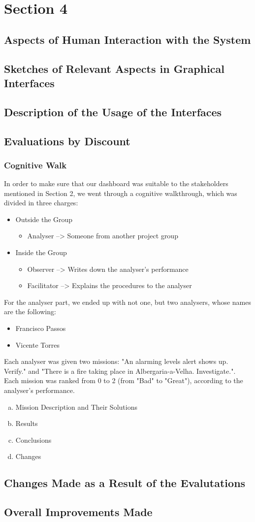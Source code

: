 \chapter{Section 4}
\section{Aspects of Human Interaction with the System}
\section{Sketches of Relevant Aspects in Graphical Interfaces}
\section{Description of the Usage of the Interfaces}
\section{Evaluations by Discount}
\subsection{Cognitive Walk}
In order to make sure that our dashboard was suitable 
to the stakeholders mentioned in Section 2, we went 
through a cognitive walkthrough, which was divided in 
three charges: 
\begin{itemize}
    \item Outside the Group
    \begin{itemize}
    \item Analyser --> Someone from another project group 
    \end{itemize}
    \item Inside the Group
    \begin{itemize}
    \item Observer --> Writes down the analyser's performance
    \item Facilitator --> Explains the procedures to the 
    analyser
    \end{itemize}
\end{itemize} \par 
For the analyser part, we ended up with not one, but two 
analysers, whose names are the following:
\begin{itemize}
    \item Francisco Passos
    \item Vicente Torres
\end{itemize} \par
Each analyser was given two missions: "An alarming levels 
alert shows up. Verify." and "There is a fire taking place 
in Albergaria-a-Velha. Investigate.". Each mission was ranked 
from 0 to 2 (from "Bad" to "Great"), according to the 
analyser's performance. 
\begin{enumerate}[a.]
    \item Mission Description and Their Solutions 
    \item Results 
    \item Conclusions 
    \item Changes 
\end{enumerate}
\section{Changes Made as a Result of the Evalutations}
\section{Overall Improvements Made}